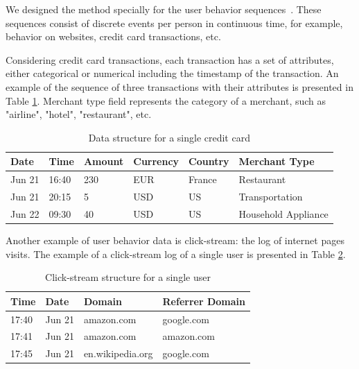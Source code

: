 \documentclass{article}
\begin{document}
We designed the method specially for the user behavior sequences~\citep{Ni2018PerceiveYU}. These sequences consist of discrete events per person in continuous time, for example,  behavior on websites, credit card transactions, etc. 

Considering credit card transactions, each transaction has a set of attributes, either categorical or numerical including the timestamp of the transaction. An example of the sequence of three transactions with their attributes is presented in Table \ref{tab-tr-data}.
Merchant type field represents the category of a merchant, such as "airline", "hotel", "restaurant", etc.

\begin{table}
\centering
\caption{Data structure for a single credit card}
\begin{tabular}{llllll}
\toprule
\textbf{Date} & \textbf{Time} & \textbf{Amount} & \textbf{Currency} & \textbf{Country} & \textbf{Merchant Type} \\
\midrule
Jun 21 & 16:40& 230 & EUR & France & Restaurant \\
Jun 21 & 20:15 & 5 & USD & US & Transportation \\
Jun 22 & 09:30 & 40 & USD & US & Household Appliance \\
\bottomrule
\end{tabular}
\label{tab-tr-data}
\end{table}

Another example of user behavior data is click-stream: the log of internet pages  visits. The example of a click-stream log of a single user is presented in Table \ref{tab-cs-data}.

\begin{table}
\centering
\caption{Click-stream structure for a single user}
\begin{tabular}{llll}
\toprule
\textbf{Time} & \textbf{Date} & \textbf{Domain} & \textbf{Referrer Domain} \\
\midrule
17:40 & Jun 21 & amazon.com & google.com \\
17:41 & Jun 21 & amazon.com & amazon.com \\
17:45 & Jun 21 & en.wikipedia.org & google.com \\
\bottomrule
\end{tabular}
\label{tab-cs-data}
\end{table}
\end{document}
